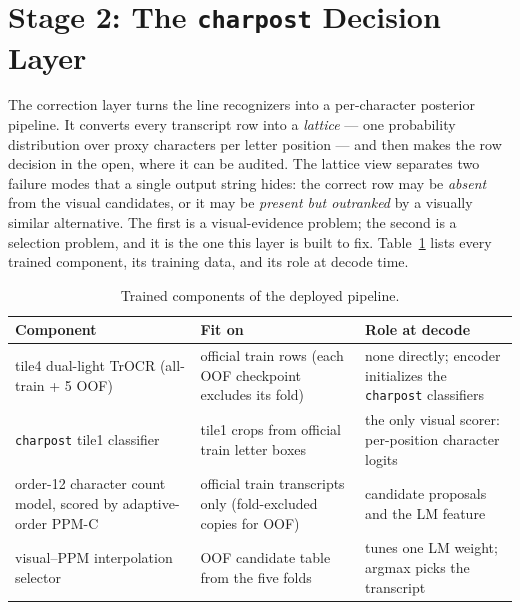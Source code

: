 \documentclass[11pt]{article}
\newcommand{\charpost}{\texttt{charpost}}
\begin{document}
\FloatBarrier
\section{Stage 2: The \charpost{} Decision Layer}
\label{sec:charpost}
The correction layer turns the line recognizers into a per-character posterior pipeline. It
converts every transcript row into a \emph{lattice} --- one probability distribution over proxy
characters per letter position --- and then makes the row decision in the open, where it can be
audited. The lattice view separates two failure modes that a single output string hides: the
correct row may be \emph{absent} from the visual candidates, or it may be \emph{present but
outranked} by a visually similar alternative. The first is a visual-evidence problem; the second
is a selection problem, and it is the one this layer is built to fix.
Table~\ref{tab:components} lists every trained component, its training data, and its role at
decode time.

\begin{table}[htbp]
\centering
\small
\caption{Trained components of the deployed pipeline.}
\label{tab:components}
\begin{tabular}{@{}>{\raggedright\arraybackslash}p{}>{\raggedright\arraybackslash}p{}>{\raggedright\arraybackslash}p{}@{}}
\toprule
\textbf{Component} & \textbf{Fit on} & \textbf{Role at decode} \\
\midrule
tile4 dual-light TrOCR (all-train + 5 OOF) & official train rows (each OOF checkpoint excludes its fold) & none directly; encoder initializes the \charpost{} classifiers \\
\charpost{} tile1 classifier & tile1 crops from official train letter boxes & the only visual scorer: per-position character logits \\
order-12 character count model, scored by adaptive-order PPM-C & official train transcripts only (fold-excluded copies for OOF) & candidate proposals and the LM feature \\
visual--PPM interpolation selector & OOF candidate table from the five folds & tunes one LM weight; argmax picks the transcript \\
\bottomrule
\end{tabular}
\end{table}
\end{document}

